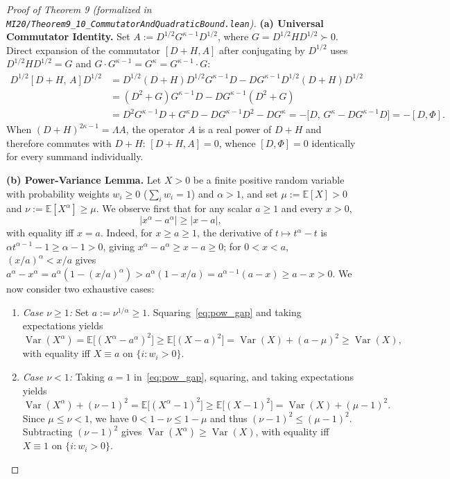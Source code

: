 \documentclass[10pt,letterpaper]{article}
\begin{document}
\begin{proof}[Proof of Theorem 9 (formalized in \texttt{MI20/Theorem9\_10\_\allowbreak CommutatorAndQuadraticBound.lean})]
\textbf{(a) Universal Commutator Identity.} Set $A := D^{1/2} G^{\kappa-1} D^{1/2}$, where $G = D^{1/2} H D^{1/2} \succ 0$. Direct expansion of the commutator $[D + H, A]$ after conjugating by $D^{1/2}$ uses $D^{1/2} H D^{1/2} = G$ and $G \cdot G^{\kappa-1} = G^\kappa = G^{\kappa-1} \cdot G$:
\begin{align*}
  D^{1/2}[D + H,\, A]D^{1/2}
  &= D^{1/2}(D + H)D^{1/2} G^{\kappa-1} D - D G^{\kappa-1} D^{1/2}(D + H)D^{1/2} \\
  &= (D^2 + G) G^{\kappa-1} D - D G^{\kappa-1}(D^2 + G) \\
  &= D^2 G^{\kappa-1} D + G^\kappa D - D G^{\kappa-1} D^2 - D G^\kappa
   = -\bigl[D,\, G^\kappa - D G^{\kappa-1} D\bigr] = -[D, \Phi].
\end{align*}
When $(D + H)^{2\kappa-1} = \Lambda A$, the operator $A$ is a real power of $D + H$ and therefore commutes with $D + H$: $[D + H, A] = 0$, whence $[D, \Phi] = 0$ identically for every summand individually.

\textbf{(b) Power-Variance Lemma.} Let $X > 0$ be a finite positive random variable with probability weights $w_i \ge 0$ ($\sum_i w_i = 1$) and $\alpha > 1$, and set $\mu := \mathbb{E}[X] > 0$ and $\nu := \mathbb{E}[X^\alpha] \ge \mu$. We observe first that for any scalar $a \ge 1$ and every $x > 0$,
\begin{equation}\label{eq:pow_gap}
  |x^\alpha - a^\alpha| \ge |x - a|,
\end{equation}
with equality iff $x = a$. Indeed, for $x \ge a \ge 1$, the derivative of $t \mapsto t^\alpha - t$ is $\alpha t^{\alpha-1} - 1 \ge \alpha - 1 > 0$, giving $x^\alpha - a^\alpha \ge x - a \ge 0$; for $0 < x < a$, $(x/a)^\alpha < x/a$ gives $a^\alpha - x^\alpha = a^\alpha(1 - (x/a)^\alpha) > a^\alpha(1 - x/a) = a^{\alpha-1}(a - x) \ge a - x > 0$. We now consider two exhaustive cases:
\begin{enumerate}[leftmargin=1.6em,itemsep=1.5pt]
  \item \emph{Case $\nu \ge 1$:} Set $a := \nu^{1/\alpha} \ge 1$. Squaring~\eqref{eq:pow_gap} and taking expectations yields
  \[
    \operatorname{Var}(X^\alpha) = \mathbb{E}\bigl[(X^\alpha - a^\alpha)^2\bigr]
    \ge \mathbb{E}\bigl[(X - a)^2\bigr]
    = \operatorname{Var}(X) + (a - \mu)^2 \ge \operatorname{Var}(X),
  \]
  with equality iff $X \equiv a$ on $\{i : w_i > 0\}$.
  \item \emph{Case $\nu < 1$:} Taking $a = 1$ in~\eqref{eq:pow_gap}, squaring, and taking expectations yields
  \[
    \operatorname{Var}(X^\alpha) + (\nu - 1)^2
    = \mathbb{E}\bigl[(X^\alpha - 1)^2\bigr]
    \ge \mathbb{E}\bigl[(X - 1)^2\bigr]
    = \operatorname{Var}(X) + (\mu - 1)^2.
  \]
  Since $\mu \le \nu < 1$, we have $0 < 1 - \nu \le 1 - \mu$ and thus $(\nu - 1)^2 \le (\mu - 1)^2$. Subtracting $(\nu - 1)^2$ gives $\operatorname{Var}(X^\alpha) \ge \operatorname{Var}(X)$, with equality iff $X \equiv 1$ on $\{i : w_i > 0\}$.
\end{enumerate}


\end{proof}
\end{document}
